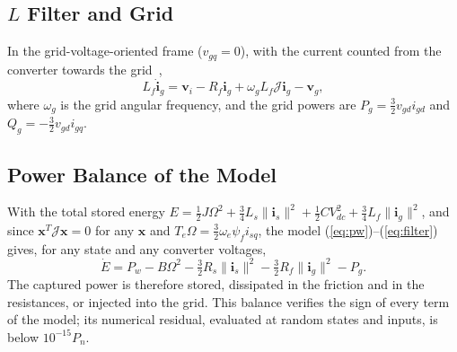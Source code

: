 \documentclass[11pt,a4paper]{article}
\newcommand{\bv}[1]{\mathbf{#1}}
\newcommand{\Jm}{\boldsymbol{\mathcal{J}}}
\begin{document}
\subsection{$L$ Filter and Grid}
In the grid-voltage-oriented frame ($v_{gq}=0$), with the current counted from the converter towards
the grid~\cite{aimene2022},
\begin{equation}
L_f\dot{\bv{i}}_g = \bv{v}_i - R_f\bv{i}_g + \omega_gL_f\Jm\bv{i}_g - \bv{v}_g ,
\label{eq:filter}
\end{equation}
where $\omega_g$ is the grid angular frequency, and the grid powers are $P_g=\frac32v_{gd}i_{gd}$ and
$Q_g=-\frac32v_{gd}i_{gq}$.

\subsection{Power Balance of the Model}
With the total stored energy
$E=\frac12J\Omega^2+\frac34L_s\|\bv{i}_s\|^2+\frac12CV_{dc}^2+\frac34L_f\|\bv{i}_g\|^2$, and since
$\bv{x}^T\Jm\bv{x}=0$ for any $\bv{x}$ and $T_e\Omega=\frac32\omega_e\psi_fi_{sq}$, the model
(\ref{eq:pw})--(\ref{eq:filter}) gives, for any state and any converter voltages,
\begin{equation}
\dot E = P_w - B\Omega^2 - \tfrac32R_s\|\bv{i}_s\|^2 - \tfrac32R_f\|\bv{i}_g\|^2 - P_g .
\label{eq:balance}
\end{equation}
The captured power is therefore stored, dissipated in the friction and in the resistances, or injected
into the grid. This balance verifies the sign of every term of the model; its numerical residual, evaluated
at random states and inputs, is below $10^{-15}P_n$.
\end{document}
